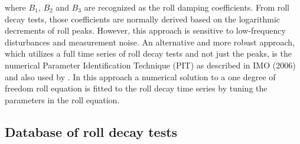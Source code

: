 




where $B_1$, $B_2$ and $B_3$ are recognized as the roll damping coefficients.
From roll decay tests, those coefficients are normally derived based on the logarithmic decrements of roll peaks. However, this approach is sensitive to low-frequency disturbances and measurement noise. An alternative and more robust approach, which utilizes a full time series of roll decay tests and not just the peaks, is the numerical Parameter Identification Technique (PIT) as described in IMO (2006) and also used by \parencite{bulian_simplified_2004}. In this approach a numerical solution to a one degree of freedom roll equation is fitted to the roll decay time series by tuning the parameters in the roll equation.



\subsection{Database of roll decay tests}
\label{se:database_of_roll_decay_tests}


%


%